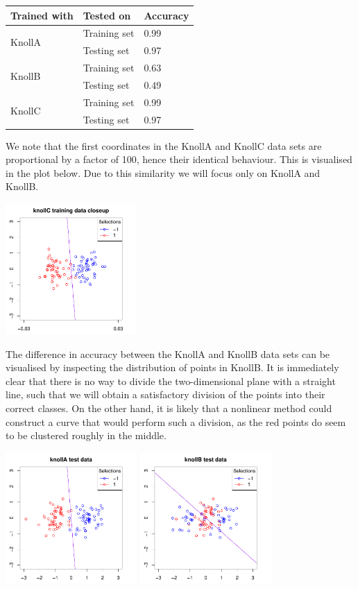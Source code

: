 \documentclass[a4paper, oneside, final]{memoir}
\begin{document}
\begin{tabular}{|l|l|l|}
  \textbf{Trained with} & \textbf{Tested on} & \textbf{Accuracy} \\\hline
  \multirow{2}{*}{KnollA} & Training set & 0.99 \\
  & Testing set & 0.97 \\\hline
  \multirow{2}{*}{KnollB} & Training set & 0.63 \\
  & Testing set & 0.49 \\\hline
  \multirow{2}{*}{KnollC} & Training set & 0.99 \\
  & Testing set & 0.97 \\\hline
\end{tabular}

We note that the first coordinates in the KnollA and KnollC data sets
are proportional by a factor of 100, hence their identical behaviour.
This is visualised in the plot below.  Due to this similarity we will
focus only on KnollA and KnollB.

\includegraphics[width=5cm]{img/question2-plot-c-close.pdf}

The difference in accuracy between the KnollA and KnollB data sets can
be visualised by inspecting the distribution of points in KnollB.  It
is immediately clear that there is no way to divide the
two-dimensional plane with a straight line, such that we will obtain a
satisfactory division of the points into their correct classes.  On
the other hand, it is likely that a nonlinear method could construct a
curve that would perform such a division, as the red points do seem to
be clustered roughly in the middle.

\includegraphics[width=5cm]{img/question2-plot-test-a.pdf}
\includegraphics[width=5cm]{img/question2-plot-test-b.pdf}
\end{document}
